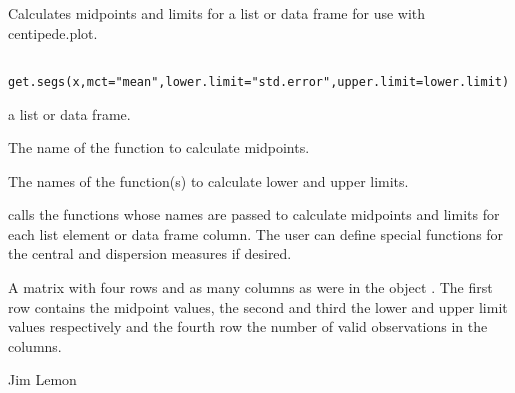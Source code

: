 \begin{Description}\relax
Calculates midpoints and limits for a list or data frame for use with
centipede.plot.
\end{Description}
\begin{Usage}
\begin{verbatim}
 get.segs(x,mct="mean",lower.limit="std.error",upper.limit=lower.limit)
\end{verbatim}
\end{Usage}
\begin{Arguments}
\begin{ldescription}
\item[\code{x}] a list or data frame.
\item[\code{mct}] The name of the function to calculate midpoints.
\item[\code{lower.limit,upper.limit}] The names of the function(s) to calculate 
lower and upper limits.
\end{ldescription}
\end{Arguments}
\begin{Details}\relax
{} calls the functions whose names are passed to calculate
midpoints and limits for each list element or data frame column. The
user can define special functions for the central and dispersion measures
if desired.
\end{Details}
\begin{Value}
A matrix with four rows and as many columns as were in the object
. The first row contains the midpoint values, the second and third
the lower and upper limit values respectively and the fourth row the number
of valid observations in the columns.
\end{Value}
\begin{Author}\relax
Jim Lemon
\end{Author}
\begin{SeeAlso}\relax
{}
\end{SeeAlso}

